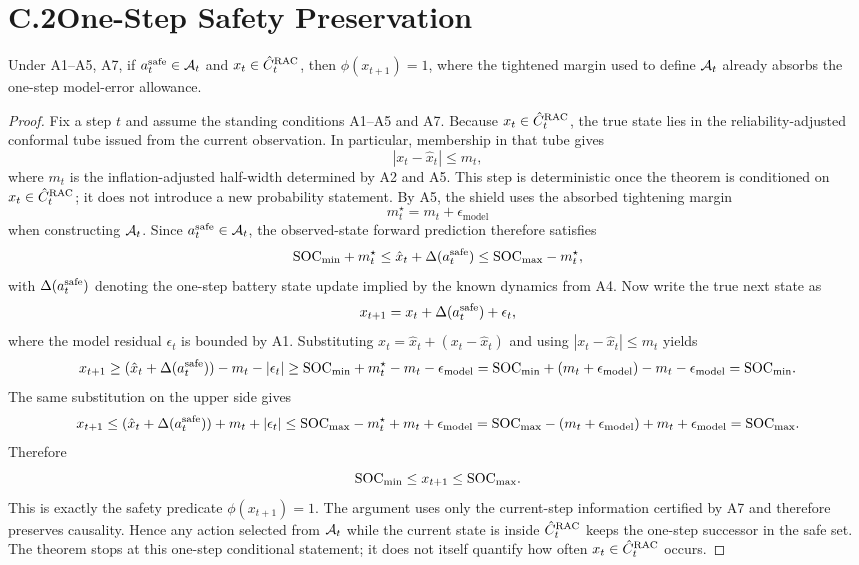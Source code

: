 \section{C.2\quad One-Step Safety Preservation}\label{sec:proof-one-step}
\begin{theorem}[restated]
Under A1--A5, A7, if $a_t^{\mathrm{safe}}\in\mathcal{A}_t$ and $x_t\in\hat{C}_t^{\mathrm{RAC}}$, then
$\phi(x_{t+1})=1$, where the tightened margin used to define $\mathcal{A}_t$
already absorbs the one-step model-error allowance.
\end{theorem}
\begin{proof}
Fix a step $t$ and assume the standing conditions A1--A5 and A7.  Because
$x_t\in\hat{C}_t^{\mathrm{RAC}}$, the true state lies in the reliability-adjusted conformal tube
issued from the current observation.  In particular, membership in that tube gives
\[
  |x_t-\hat{x}_t| \le m_t,
\]
where $m_t$ is the inflation-adjusted half-width determined by A2 and A5.
This step is deterministic once the theorem is conditioned on $x_t\in\hat{C}_t^{\mathrm{RAC}}$;
it does not introduce a new probability statement.  By A5, the shield uses
the absorbed tightening margin
\[
  m_t^\star = m_t + \epsilon_{\mathrm{model}}
\]
when constructing $\mathcal{A}_t$.  Since $a_t^{\mathrm{safe}}\in\mathcal{A}_t$, the observed-state forward
prediction therefore satisfies
\[
  \mathrm{SOC}_{\min}+m_t^\star
  \le
  \hat{x}_t + \Delta(a_t^{\mathrm{safe}})
  \le
  \mathrm{SOC}_{\max}-m_t^\star,
\]
with $\Delta(a_t^{\mathrm{safe}})$ denoting the one-step battery state update implied by
the known dynamics from A4.  Now write the true next state as
\[
  x_{t+1} = x_t + \Delta(a_t^{\mathrm{safe}}) + \epsilon_t,
\]
where the model residual $\epsilon_t$ is bounded by A1.  Substituting
$x_t = \hat{x}_t + (x_t-\hat{x}_t)$ and using $|x_t-\hat{x}_t|\le m_t$ yields
\[
  x_{t+1}
  \ge (\hat{x}_t+\Delta(a_t^{\mathrm{safe}})) - m_t - |\epsilon_t|
  \ge \mathrm{SOC}_{\min} + m_t^\star - m_t - \epsilon_{\mathrm{model}}
  =
  \mathrm{SOC}_{\min} + (m_t+\epsilon_{\mathrm{model}}) - m_t - \epsilon_{\mathrm{model}}
  =
  \mathrm{SOC}_{\min}.
\]
The same substitution on the upper side gives
\[
  x_{t+1}
  \le (\hat{x}_t+\Delta(a_t^{\mathrm{safe}})) + m_t + |\epsilon_t|
  \le \mathrm{SOC}_{\max} - m_t^\star + m_t + \epsilon_{\mathrm{model}}
  =
  \mathrm{SOC}_{\max} - (m_t+\epsilon_{\mathrm{model}}) + m_t + \epsilon_{\mathrm{model}}
  =
  \mathrm{SOC}_{\max}.
\]
Therefore
\[
  \mathrm{SOC}_{\min} \le x_{t+1} \le \mathrm{SOC}_{\max}.
\]
This is exactly the safety predicate $\phi(x_{t+1})=1$.  The argument uses
only the current-step information certified by A7 and therefore preserves
causality.  Hence any action selected from $\mathcal{A}_t$ while the current state is
inside $\hat{C}_t^{\mathrm{RAC}}$ keeps the one-step successor in the safe set.  The theorem
stops at this one-step conditional statement; it does not itself quantify how
often $x_t\in\hat{C}_t^{\mathrm{RAC}}$ occurs.
\qedhere
\end{proof}

